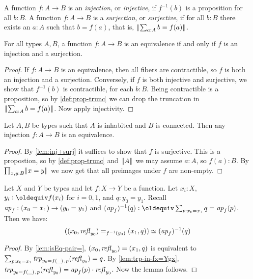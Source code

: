 \begin{definition}
\begin{definition}\label{def:injection}
A function $f:A\to B$ is an \emph{injection}, or \emph{injective}, 
if $f^{-1}(b)$ is a proposition for all $b:B$.
A function $f:A\to B$ is a \emph{surjection}, or \emph{surjective},
if for all $b:B$ there exists an $a:A$ such that $b=f(a)$,
that is, $\lVert\sum_{a:A} b=f(a)\rVert$.

\end{definition}

\begin{lemma}\label{lem:inj+surj}
For all types $A,B$, a function $f: A\to B$ is an equivalence 
if and only if $f$ is an injection and a surjection.
\end{lemma}

\begin{proof}
If $f: A\to B$ is an equivalence, then all fibers are contractible,
so $f$ is both an injection and a surjection. Conversely,
if $f$ is both injective and surjective, we show that
$f^{-1}(b)$ is contractible, for each $b:B$. 
Being contractible is a proposition, so by \cref{def:prop-trunc}
we can drop the truncation in $\lVert\sum_{a:A} b=f(a)\rVert$.
Now apply injectivity.
\end{proof}

\begin{corollary}\label{cor:inj+connected}
Let $A,B$ be types such that $A$ is inhabited and $B$ is connected.
Then any injection $f: A\to B$ is an equivalence.
\end{corollary}
\begin{proof}
By \cref{lem:inj+surj} it suffices to show that $f$ is surjective.
This is a propostion, so by \cref{def:prop-trunc} and $\lVert A\rVert$
we may assume $a:A$, so $f(a):B$. By $\prod_{x,y:B} \lVert x=y\rVert$
we now get that all preimages under $f$ are non-empty.
\end{proof}

\begin{lemma}\label{lem:fib-vs-path}
Let $X$ and $Y$ be types and let $f:X\to Y$ be a function.
Let $x_i:X$, $y_i\defeq f(x_i)$ for $i=0,1$, and $q:y_0 = y_1$.
Recall $\mathop{{\it ap}_{f}}: (x_0=x_1) \to (y_0 = y_1)$ and
$(\ap{f})^{-1}(q) \defeq \sum_{p:x_0=x_1} q =\ap{f}(p)$.
Then we have:
\[
((x_0,\mathop{{\it refl}_{y_0}})=_{f^{-1}(y_0)}(x_1,q))\simeq (\mathop{{\it ap}_{f}})^{-1}(q)
\]
\end{lemma}
\begin{proof}
By \cref{lem:isEq-pair=},
$(x_0,\mathop{{\it refl}_{y_0}})=(x_1,q)$ is equivalent to
$\sum_{p:x_0=x_1}\mathord{\mathit{trp}}_{y_0=f(\_),\,p}(\mathop{{\it refl}_{y_0}}) = q$.
By \cref{lem:trp-in-fx=Ygx}, $\mathord{\mathit{trp}}_{y_0=f(\_),\,p}(\mathop{{\it refl}_{y_0}}) =
\mathop{{\it ap}_{f}}(p) \cdot \mathop{{\it refl}_{y_0}}$. Now the lemma follows.
\end{proof}


\end{definition}
